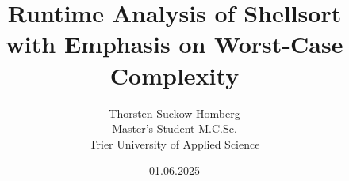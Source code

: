\documentclass[peerreview]{IEEEtran}
\theoremstyle{definition} %
\begin{document}
\title{Runtime Analysis of Shellsort \\with Emphasis on Worst-Case Complexity}



\author{Thorsten Suckow-Homberg \\
Master's Student M.C.Sc.\\
Trier University of Applied Science
}
\date{01.06.2025}

\maketitle
\tableofcontents
\listoffigures
\listoftables

\IEEEpeerreviewmaketitle









\sloppy
\printbibliography
\fussy
\end{document}
